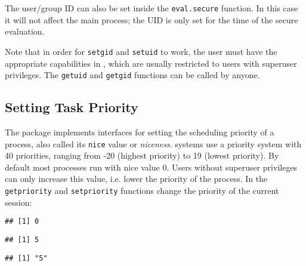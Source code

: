 

The user/group ID can also be set inside the \texttt{eval.secure} function. In
this case it will not affect the main process; the UID is only set for the time
of the secure evaluation.



Note that in order for \texttt{setgid} and \texttt{setuid} to work, the user
must have the appropriate capabilities in \Linux, which are usually
restricted to users with superuser privileges. The \texttt{getuid} and
\texttt{getgid} functions can be called by anyone.

\subsection{Setting Task Priority}
\label{priority}

The \RAppArmor package implements interfaces for setting the scheduling priority
of a process, also called its \texttt{nice} value or \emph{niceness}. \Linux
systems use a priority system with 40 priorities, ranging from -20 (highest
priority) to 19 (lowest priority). By default most processes run with nice
value 0. Users without superuser privileges can only increase this value, i.e.
lower the priority of the process. In \RAppArmor the \texttt{getpriority} and
\texttt{setpriority} functions change the priority of the current session:

\begin{knitrout}\mycodesize
{}\color{fgcolor}\begin{kframe}
\begin{alltt}
\hlstd{()}
\end{alltt}
\begin{verbatim}
## [1] 0
\end{verbatim}
\begin{alltt}
\hlstd{(}\hlstd{)}
\end{alltt}
\begin{verbatim}
## [1] 5
\end{verbatim}
\begin{alltt}
\hlstd{(}\hlstd{,}  \hlstd{=} \hlstd{)}
\end{alltt}
\begin{verbatim}
## [1] "5"
\end{verbatim}
\begin{alltt}
\hlstd{(}\hlstd{)}
\end{alltt}


{\ttfamily\noindent\bfseries\color{errorcolor}{\#\# Error: Failed to set priority. }}\end{kframe}
\end{knitrout}


